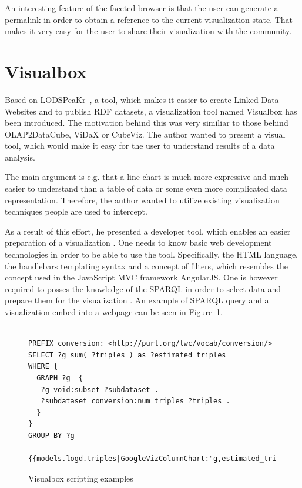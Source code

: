 An interesting feature of the faceted browser is that the user can 
generate a permalink in order to obtain a reference to the current visualization 
state. That makes it very easy for the user to share their visualization with the 
community.

\section{Visualbox}
Based on LODSPeaKr~\cite{lodspeakr}, a tool, which makes it easier to create Linked Data Websites 
and to publish RDF datasets, a visualization tool named Visualbox has been 
introduced. The motivation behind this was very similiar to those behind 
OLAP2DataCube, ViDaX or CubeViz. The author wanted to present a visual tool,
which would 
make it easy for the user to understand results of a data analysis.

The main argument is e.g. that a line chart is much more expressive and much easier
to understand than a table of data or some even more complicated data 
representation. Therefore, the author wanted to utilize existing visualization 
techniques people are used to intercept.

As a result of this effort, he presented a developer tool, which enables an easier preparation
of a visualization . One needs to know basic web development technologies 
in order to be able to use the tool. Specifically, the HTML language, the 
handlebars templating syntax and a concept of filters, which resembles the 
concept used in the JavaScript MVC framework AngularJS. One is however required
to posses the knowledge of the SPARQL in order to select data and prepare them for the 
visualization . An example of SPARQL query and a visualization embed into a webpage can be seen
in Figure~\ref{visualbox-example}.

\begin{figure}
\scriptsize\begin{verbatim}

PREFIX conversion: <http://purl.org/twc/vocab/conversion/>
SELECT ?g sum( ?triples ) as ?estimated_triples
WHERE {
  GRAPH ?g  {
   ?g void:subset ?subdataset .
   ?subdataset conversion:num_triples ?triples .
  }
} 
GROUP BY ?g

{{models.logd.triples|GoogleVizColumnChart:"g,estimated_triples,width=1200"}}
\end{verbatim}\normalsize
\caption{Visualbox scripting examples}
\label{visualbox-example}
\end{figure}

